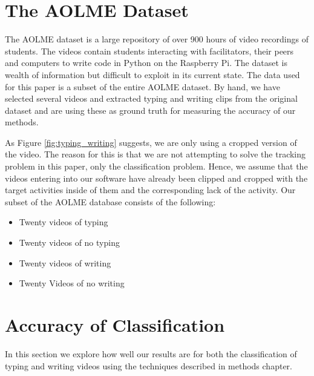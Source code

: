 \section{\label{section:the_data}The AOLME Dataset}
The AOLME dataset is a large repository of over 900 hours of video
recordings of students. The videos contain students
interacting with facilitators, their peers and computers to write code in
Python on the Raspberry Pi.  The dataset is wealth of information but difficult
to exploit in its current state.  The data used for this paper is a subset of
the entire AOLME dataset. By hand, we have selected several videos and extracted
typing and writing clips from the original dataset and are using these as ground
truth for measuring the accuracy of our methods.

As Figure \ref{fig:typing_writing} suggests, we are only using a cropped version
of the video. The reason for this is that we are not attempting to solve the tracking
problem in this paper, only the classification problem. Hence, we assume that
the videos entering into our software have already been clipped and cropped with
the target activities inside of them and the corresponding lack of the activity.
Our subset of the AOLME database consists of the following:

\begin{itemize}
\item Twenty videos of typing
\item Twenty videos of no typing
\item Twenty videos of writing
\item Twenty Videos of no writing
\end{itemize}

\section{\label{section:accuracy} Accuracy of Classification}
In this section we explore how well our results are for both the classification
of typing and writing videos using the techniques described in methods chapter.

